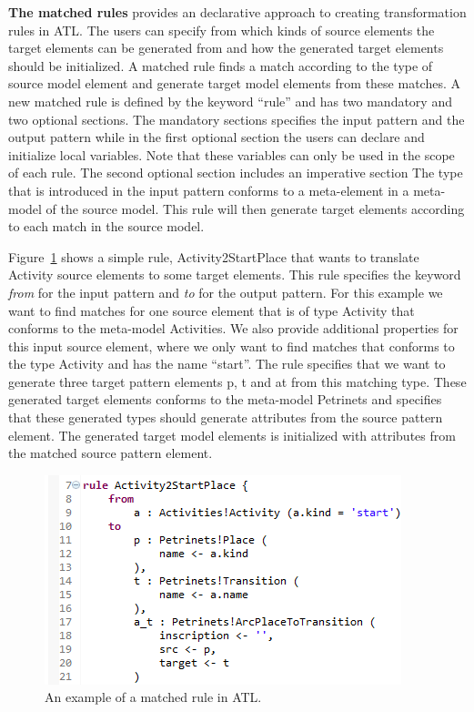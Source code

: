 \textbf{The matched rules} provides an declarative approach to
creating transformation rules in ATL. The users can specify from which kinds of
source elements the target elements can be generated from and how the generated
target elements should be initialized. A matched rule finds a match according to
the type of source model element and generate target model elements from these
matches. A new matched rule is defined by the keyword ``rule'' and has two
mandatory and two optional sections. The mandatory sections specifies the input
pattern and the output pattern while in the first optional section the users can
declare and initialize local variables. Note that these variables can only be
used in the scope of each rule. The second optional section includes an
imperative section The type that is introduced in the input pattern conforms to
a meta-element in a meta-model of the source model. This rule will then generate
target elements according to each match in the source model.

Figure~\ref{fig:ATL_Example} shows a simple rule, Activity2StartPlace that wants
to translate Activity source elements to some target elements. This rule
specifies the keyword \textit{from} for the input pattern and \textit{to} for
the output pattern. For this example we want to find matches for one source
element that is of type Activity that conforms to the meta-model Activities. We
also provide additional properties for this input source element, where we only
want to find matches that conforms to the type Activity and has the name
``start''. The rule specifies that we want to generate three target
pattern elements p, t and a\textunderscore t from this matching type. These
generated target elements conforms to the meta-model Petrinets and specifies
that these generated types should generate attributes from the source
pattern element. The generated target model elements is initialized with
attributes from the matched source pattern element. 

\begin{figure}[H]
	\centering
	\includegraphics[scale=0.7]{figures/ATL_Example.png}
	\caption[Example of a matched rule in ATL]
	{An example of a matched rule in ATL.}
	\label{fig:ATL_Example}
\end{figure}

